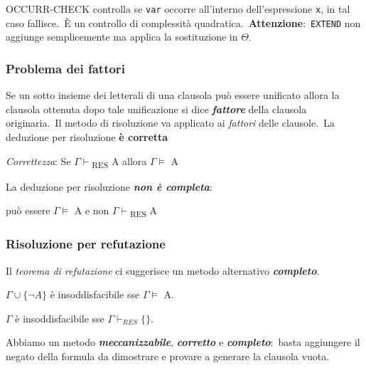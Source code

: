 \noindent OCCURR-CHECK controlla se \texttt{var} occorre all'interno dell'espressione \texttt{x}, in tal caso fallisce.\
È un controllo di complessità quadratica.\
\textbf{Attenzione}:\ \texttt{EXTEND} non aggiunge semplicemente ma applica la sostituzione in $\Theta$.

\subsubsection{Problema dei fattori}
Se un sotto insieme dei letterali di una clausola può essere unificato allora la clausola ottenuta dopo tale unificazione si dice \textbf{\textit{fattore}} della clausola originaria.\
Il metodo di risoluzione va applicato ai \textit{fattori} delle clausole.\
La deduzione per risoluzione \textbf{è corretta}

\begin{center}
	\textit{Correttezza}: Se $\Gamma \vdash$\textsubscript{RES} A allora $\Gamma \models$ A
\end{center}

\noindent La deduzione per risoluzione \textbf{\textit{non è completa}}:
\begin{center}
	può essere $\Gamma \models$ A e non $\Gamma \vdash$\textsubscript{RES} A
\end{center}

\subsubsection{Risoluzione per refutazione}

Il \textit{teorema di refutazione} ci suggerisce un metodo alternativo \textbf{\textit{completo}}.

\begin{theorem}[Refutazione]
	$\Gamma \cup \{\lnot A\}$ è insoddisfacibile sse $\Gamma \models$ A.
\end{theorem}

\begin{theorem}
	$\Gamma$ è insoddisfacibile sse $\Gamma \vdash_{RES} \{ \}$.
\end{theorem}

\noindent Abbiamo un metodo \textbf{\textit{meccanizzabile}}, \textbf{\textit{corretto}} e \textbf{\textit{completo}}:\ basta aggiungere il negato della formula da dimostrare e provare a generare la clausola vuota.
